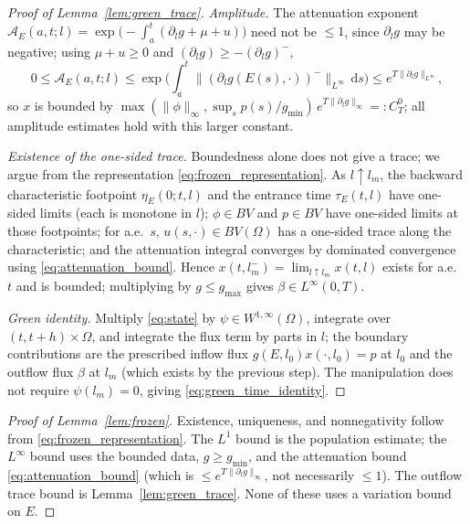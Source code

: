 \documentclass[pdflatex,sn-mathphys-num]{sn-jnl}
\newcommand{\Om}{\Omega}
\newcommand{\dd}{\,\mathrm{d}}
\theoremstyle{plain}
\theoremstyle{definition}
\theoremstyle{remark}
\begin{document}
\begin{proof}[Proof of Lemma~\ref{lem:green_trace}]
\emph{Amplitude.} The attenuation exponent
$\mathcal A_E(a,t;l)=\exp\!\big(-\!\int_a^t(\partial_lg+\mu+u)\big)$ need not be
$\le1$, since $\partial_lg$ may be negative; using $\mu+u\ge0$ and
$(\partial_lg)\ge-(\partial_lg)^-$,
\begin{equation}\label{eq:attenuation_bound}
0\le\mathcal A_E(a,t;l)
\le\exp\!\Big(\int_a^t\|(\partial_lg(E(s),\cdot))^-\|_{L^\infty}\dd s\Big)
\le e^{T\|\partial_lg\|_{L^\infty}},
\end{equation}
so $x$ is bounded by $\max(\|\phi\|_\infty,\sup_s p(s)/g_{\min})\,
e^{T\|\partial_lg\|_\infty}=:C_T^0$; all amplitude estimates hold with this larger
constant.

\emph{Existence of the one-sided trace.} Boundedness alone does not give a trace;
we argue from the representation \eqref{eq:frozen_representation}. As
$l\uparrow l_m$, the backward characteristic footpoint $\eta_E(0;t,l)$ and the
entrance time $\tau_E(t,l)$ have one-sided limits (each is monotone in $l$);
$\phi\in BV$ and $p\in BV$ have one-sided limits at those footpoints; for a.e.\
$s$, $u(s,\cdot)\in BV(\Om)$ has a one-sided trace along the characteristic; and
the attenuation integral converges by dominated convergence using
\eqref{eq:attenuation_bound}. Hence $x(t,l_m^-)=\lim_{l\uparrow l_m}x(t,l)$ exists
for a.e.\ $t$ and is bounded; multiplying by $g\le g_{\max}$ gives
$\beta\in L^\infty(0,T)$.

\emph{Green identity.} Multiply \eqref{eq:state} by $\psi\in W^{1,\infty}(\Om)$,
integrate over $(t,t+h)\times\Om$, and integrate the flux term by parts in $l$;
the boundary contributions are the prescribed inflow flux
$g(E,l_0)x(\cdot,l_0)=p$ at $l_0$ and the outflow flux $\beta$ at $l_m$ (which
exists by the previous step). The manipulation does not require $\psi(l_m)=0$,
giving \eqref{eq:green_time_identity}.
\end{proof}

\begin{proof}[Proof of Lemma~\ref{lem:frozen}]
Existence, uniqueness, and nonnegativity follow from
\eqref{eq:frozen_representation}. The $L^1$ bound is the population estimate; the
$L^\infty$ bound uses the bounded data, $g\ge g_{\min}$, and the attenuation bound
\eqref{eq:attenuation_bound} (which is $\le e^{T\|\partial_lg\|_\infty}$, not
necessarily $\le1$). The outflow trace bound is Lemma~\ref{lem:green_trace}. None
of these uses a variation bound on $E$.
\end{proof}
\end{document}
